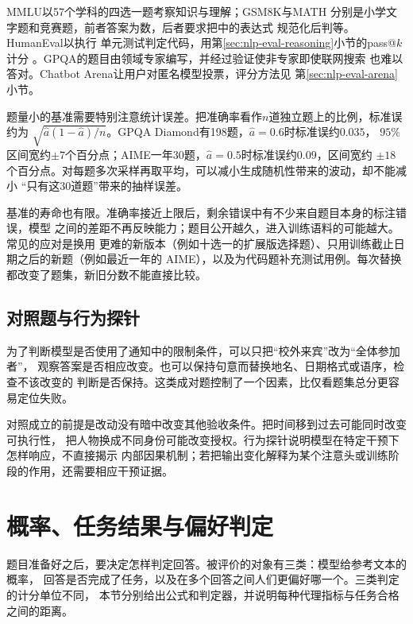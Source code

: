 MMLU以57个学科的四选一题考察知识与理解\cite{nlp-eval-hendrycks2021mmlu}；GSM8K与MATH
分别是小学文字题和竞赛题，前者答案为数，后者要求把中的表达式
规范化后判等。HumanEval以执行
单元测试判定代码，用第\ref{sec:nlp-eval-reasoning}小节的pass@$k$计分
。GPQA的题目由领域专家编写，并经过验证使非专家即使联网搜索
也难以答对。Chatbot Arena让用户对匿名模型投票，评分方法见
第\ref{sec:nlp-eval-arena}小节。

题量小的基准需要特别注意统计误差。把准确率看作$n$道独立题上的比例，标准误约为
$\sqrt{\hat a(1-\hat a)/n}$。GPQA Diamond有198题，$\hat a=0.6$时标准误约$0.035$，
$95\%$区间宽约$\pm7$个百分点；AIME一年30题，$\hat a=0.5$时标准误约$0.09$，区间宽约
$\pm18$个百分点。对每题多次采样再取平均，可以减小生成随机性带来的波动，却不能减小
“只有这30道题”带来的抽样误差。

基准的寿命也有限。准确率接近上限后，剩余错误中有不少来自题目本身的标注错误，模型
之间的差距不再反映能力；题目公开越久，进入训练语料的可能越大。常见的应对是换用
更难的新版本（例如十选一的扩展版选择题）、只用训练截止日期之后的新题（例如最近一年的
AIME），以及为代码题补充测试用例。每次替换都改变了题集，新旧分数不能直接比较。

\subsection{对照题与行为探针}
\label{sec:nlp-eval-probes}

为了判断模型是否使用了通知中的限制条件，可以只把“校外来宾”改为“全体参加者”，
观察答案是否相应改变。也可以保持句意而替换地名、日期格式或语序，检查不该改变的
判断是否保持。这类成对题控制了一个因素，比仅看题集总分更容易定位失败。

对照成立的前提是改动没有暗中改变其他验收条件。把时间移到过去可能同时改变可执行性，
把人物换成不同身份可能改变授权。行为探针说明模型在特定干预下怎样响应，不直接揭示
内部因果机制；若把输出变化解释为某个注意头或训练阶段的作用，还需要相应干预证据。

\section{概率、任务结果与偏好判定}
\label{sec:nlp-eval-measures}

题目准备好之后，要决定怎样判定回答。被评价的对象有三类：模型给参考文本的概率，
回答是否完成了任务，以及在多个回答之间人们更偏好哪一个。三类判定的计分单位不同，
本节分别给出公式和判定器，并说明每种代理指标与任务合格之间的距离。

